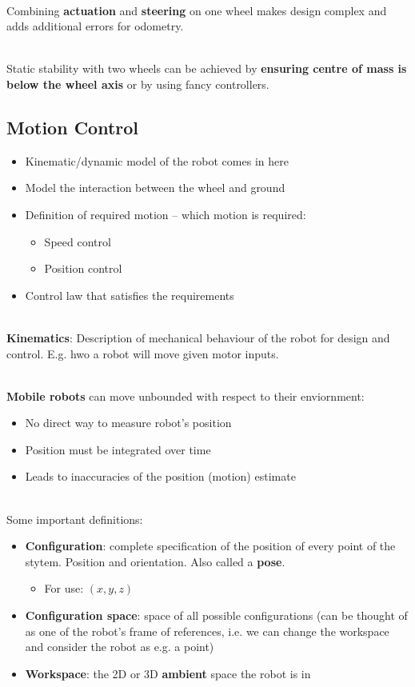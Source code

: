 \documentclass[13pt]{article}
\begin{document}
\hfill \\
\noindent
Combining \textbf{actuation} and \textbf{steering} on one wheel makes design complex and adds additional errors for
odometry.

\hfill \\
\noindent
Static stability with two wheels can be achieved by \textbf{ensuring centre of mass is below the wheel axis} or by using
fancy controllers.

\subsection{Motion Control}%
\begin{itemize}
	\item Kinematic/dynamic model of the robot comes in here
	\item Model the interaction between the wheel and ground
	\item Definition of required motion -- which motion is required:
	\begin{itemize}
		\item Speed control
		\item Position control
	\end{itemize}
	\item Control law that satisfies the requirements
\end{itemize}

\hfill \\
\noindent
\textbf{Kinematics}: Description of mechanical behaviour of the robot for design and control. E.g. hwo a robot will move
given motor inputs.

\hfill \\
\noindent
\textbf{Mobile robots} can move unbounded with respect to their enviornment:
\begin{itemize}
	\item No direct way to measure robot's position
	\item Position must be integrated over time
	\item Leads to inaccuracies of the position (motion) estimate
\end{itemize}

\hfill \\
\noindent
Some important definitions:
\begin{itemize}
	\item \textbf{Configuration}: complete specification of the position of every point of the stytem. Position and
		orientation. Also called a \textbf{pose}.
	\begin{itemize}
		\item For use: $(x, y, z)$
	\end{itemize}
	\item \textbf{Configuration space}: space of all possible configurations (can be thought of as one of the robot's
		frame of references, i.e. we can change the workspace and consider the robot as e.g. a point)
	\item \textbf{Workspace}: the 2D or 3D \textbf{ambient} space the robot is in
\end{itemize}
\end{document}
